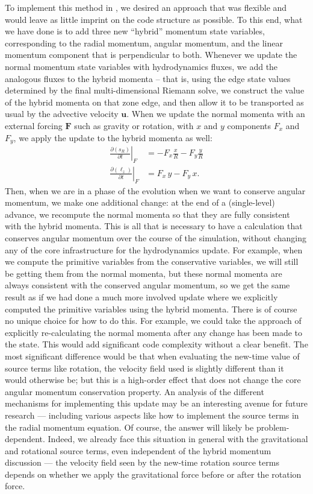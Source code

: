 \documentclass[12pt]{article}
\begin{document}
To implement this method in \castro, we desired an approach that was flexible
and would leave as little imprint on the code structure as possible.
To this end, what we have done is to add three new ``hybrid'' momentum state
variables, corresponding to the radial momentum, angular momentum, and the linear
momentum component that is perpendicular to both. Whenever we update the normal
momentum state variables with hydrodynamics fluxes, we add the analogous fluxes
to the hybrid momenta -- that is, using the edge state values determined by the
final multi-dimensional Riemann solve, we construct the value of the hybrid
momenta on that zone edge, and then allow it to be transported as usual by the
advective velocity $\mathbf{u}$. When we update the normal momenta with an
external forcing $\mathbf{F}$ such as gravity or rotation, with $x$ and $y$
components $F_x$ and $F_y$, we apply the update to the hybrid momenta as well:
\begin{align}
  \left.\frac{\partial(s_R)}{\partial t}\right|_{F} &= -F_x \frac{x}{R} - F_y\frac{y}{R} \label{eq:force-radial}\\
  \left.\frac{\partial(\ell_z)}{\partial t}\right|_{F} &= F_x\, y - F_y\, x.\label{eq:force-angular}
  \end{align}
Then, when we are in a phase of the evolution when we want to conserve angular
momentum, we make one additional change: at the end of a (single-level) advance,
we recompute the normal momenta so that they are fully consistent with the hybrid
momenta. This is all that is necessary to have a calculation that conserves angular
momentum over the course of the simulation, without changing any of the
core infrastructure for the hydrodynamics update. For example, when we compute
the primitive variables from the conservative variables, we will still be
getting them from the normal momenta, but these normal momenta are always consistent
with the conserved angular momentum, so we get the same result as if we had done
a much more involved update where we explicitly computed the primitive variables
using the hybrid momenta. There is of course no unique choice for how to do this.
For example, we could take the approach of explicitly re-calculating the normal
momenta after any change has been made to the state. This would add significant code
complexity without a clear benefit. The most significant difference would be
that when evaluating the new-time value of source terms like rotation, the velocity
field used is slightly different than it would otherwise be; but this is a high-order
effect that does not change the core angular momentum conservation property. An
analysis of the different mechanisms for implementing this update may be an interesting
avenue for future research --- including various aspects like how to implement the
source terms in the radial momentum equation. Of course, the answer will likely
be problem-dependent. Indeed, we already face this situation in general with the
gravitational and rotational source terms, even independent of the hybrid momentum
discussion --- the velocity field seen by the new-time rotation source terms depends
on whether we apply the gravitational force before or after the rotation force.
\end{document}
